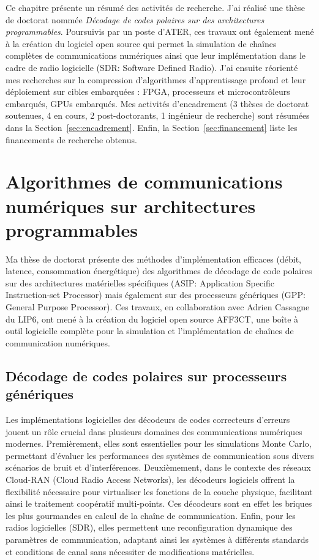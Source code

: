 \documentclass[11pt]{report}
\begin{document}
Ce chapitre présente un résumé des activités de recherche. J'ai réalisé une thèse de doctorat nommée \textit{Décodage de codes polaires sur des architectures programmables}. Poursuivis par un poste d'ATER, ces travaux ont également mené à la création du logiciel open source qui permet la simulation de chaînes complètes de communications numériques ainsi que leur implémentation dans le cadre de radio logicielle (SDR: Software Defined Radio). J'ai ensuite réorienté mes recherches sur la compression d'algorithmes d'apprentissage profond et leur déploiement sur cibles embarquées : FPGA, processeurs et microcontrôleurs embarqués, GPUs embarqués. Mes activités d'encadrement (3 thèses de doctorat soutenues, 4 en cours, 2 post-doctorants, 1 ingénieur de recherche) sont résumées dans la Section~\ref{sec:encadrement}. Enfin, la Section~\ref{sec:financement} liste les financements de recherche obtenus.


\section{Algorithmes de communications numériques sur architectures programmables}
\label{sec:chaines_communication}

Ma thèse de doctorat présente des méthodes d'implémentation efficaces (débit, latence, consommation énergétique) des algorithmes de décodage de code polaires sur des architectures matérielles spécifiques (ASIP: Application Specific Instruction-set Processor) mais également sur des processeurs génériques (GPP: General Purpose Processor). Ces travaux, en collaboration avec Adrien Cassagne du LIP6, ont mené à la création du logiciel open source AFF3CT, une boîte à outil logicielle complète pour la simulation et l'implémentation de chaînes de communication numériques.


\subsection{Décodage de codes polaires sur processeurs génériques}

Les implémentations logicielles des décodeurs de codes correcteurs d'erreurs jouent un rôle crucial dans plusieurs domaines des communications numériques modernes. Premièrement, elles sont essentielles pour les simulations Monte Carlo, permettant d'évaluer les performances des systèmes de communication sous divers scénarios de bruit et d'interférences. Deuxièmement, dans le contexte des réseaux Cloud-RAN (Cloud Radio Access Networks), les décodeurs logiciels offrent la flexibilité nécessaire pour virtualiser les fonctions de la couche physique, facilitant ainsi le traitement coopératif multi-points. Ces décodeurs sont en effet les briques les plus gourmandes en calcul de la chaîne de communication. Enfin, pour les radios logicielles (SDR), elles permettent une reconfiguration dynamique des paramètres de communication, adaptant ainsi les systèmes à différents standards et conditions de canal sans nécessiter de modifications matérielles.
\end{document}
